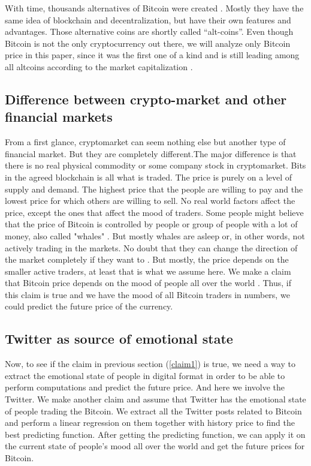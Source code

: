 \documentclass[a4paper,11pt,oneside]{article}
\begin{document}
  With time, thousands alternatives of Bitcoin were created \cite{cryptolist}. Mostly they have the same idea of blockchain and decentralization, but have their own features and advantages. Those alternative coins are shortly called “alt-coins”. Even though Bitcoin is not the only cryptocurrency out there, we will analyze only Bitcoin price in this paper, since it was the first one of a kind and is still leading among all altcoins according to the market capitalization \cite{cryptolist}.
  
  \subsection{Difference between crypto-market and other financial markets} \label{marketdifference}
  
  From a first glance, cryptomarket can seem nothing else but another type of financial market. But they are completely different.The major difference is that there is no real physical commodity or some company stock in cryptomarket. Bits in the agreed blockchain is all what is traded. The price is purely on a level of supply and demand. The highest price that the people are willing to pay and the lowest price for which others are willing to sell. No real world factors affect the price, except the ones that affect the mood of traders. Some people might believe that the price of Bitcoin is controlled by people or group of people with a lot of money, also called "whales" \cite{whales}. But mostly whales are asleep or, in other words, not actively trading in the markets. No doubt that they can change the direction of the market completely if they want to \cite{whales}. But mostly, the price depends on the smaller active traders, at least that is what we assume here. We make a claim that Bitcoin price depends on the mood of people all over the world \label{claim1}. Thus, if this claim is true and we have the mood of all Bitcoin traders in numbers, we could predict the future price of the currency.
  
  \subsection{Twitter as source of emotional state}
  
  Now, to see if the claim in previous section (\ref{claim1}) is true, we need a way to extract the emotional state of people in digital format in order to be able to perform computations and predict the future price. And here we involve the Twitter. We make another claim and assume that Twitter has the emotional state of people trading the Bitcoin. We extract all the Twitter posts related to Bitcoin and perform a linear regression on them together with history price to find the best predicting function. After getting the predicting function, we can apply it on the current state of people's mood all over the world and get the future prices for Bitcoin. 
  
\end{document}
